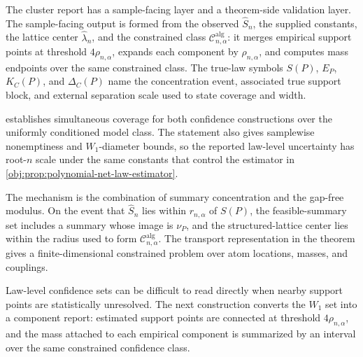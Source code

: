The cluster report has a sample-facing layer and a theorem-side validation layer. The sample-facing output is formed from the observed \(\widehat S_n\), the supplied constants, the lattice center \(\widehat\lambda_n\), and the constrained class \(\mathcal C^{\mathrm{alg}}_{n,\alpha}\): it merges empirical support points at threshold \(4\rho_{n,\alpha}\), expands each component by \(\rho_{n,\alpha}\), and computes mass endpoints over the same constrained class. The true-law symbols \(S(P)\), \(E_P\), \(K_C(P)\), and \(\Delta_C(P)\) name the concentration event, associated true support block, and external separation scale used to state coverage and width.

 establishes simultaneous coverage for both confidence constructions over the uniformly conditioned model class. The statement also gives samplewise nonemptiness and \(W_1\)-diameter bounds, so the reported law-level uncertainty has root-\(n\) scale under the same constants that control the estimator in \cref{obj:prop:polynomial-net-law-estimator}.

The mechanism is the combination of summary concentration and the gap-free modulus. On the event that \(\widehat S_n\) lies within \(r_{n,\alpha}\) of \(S(P)\), the feasible-summary set includes a summary whose image is \(\nu_P\), and the structured-lattice center lies within the radius used to form \(\mathcal C^{\mathrm{alg}}_{n,\alpha}\). The transport representation in the theorem gives a finite-dimensional constrained problem over atom locations, masses, and couplings.

Law-level confidence sets can be difficult to read directly when nearby support points are statistically unresolved. The next construction converts the \(W_1\) set into a component report: estimated support points are connected at threshold \(4\rho_{n,\alpha}\), and the mass attached to each empirical component is summarized by an interval over the same constrained confidence class.

